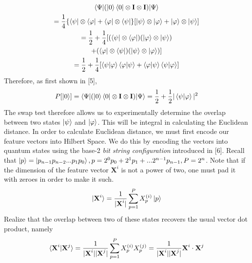 \documentclass[twocolumn, english]{revtex4-2}
\numberwithin{equation}{section}
\begin{document}
\begin{equation}\begin{gathered}
\braket{\Psi|(\ket{0}\bra{0}\otimes\textbf{I}\otimes\textbf{I})|\Psi}\\=\frac{1}{4}\{\bra{\psi}\otimes\bra{\varphi}+\bra{\varphi}\otimes\bra{\psi}\}[\ket{\psi}\otimes\ket{\varphi}+\ket{\varphi}\otimes\ket{\psi}]\\
=\frac{1}{2}+\frac{1}{4}[(\bra{\psi}\otimes\bra{\varphi})(\ket{\varphi}\otimes\ket{\psi})\\+(\bra{\varphi}\otimes\bra{\psi})(\ket{\psi}\otimes\ket{\varphi})]\\
=\frac{1}{2}+\frac{1}{4}[\braket{\psi|\varphi}\braket{\varphi|\psi}+\braket{\varphi|\psi}\braket{\psi|\varphi}]
\end{gathered}\end{equation}
Therefore, as first shown in [5],
\begin{equation}
P[\ket{0}] = \braket{\Psi|(\ket{0}\bra{0}\otimes\textbf{I}\otimes\textbf{I})|\Psi} = \frac{1}{2}+\frac{1}{2}|\braket{\psi|\varphi}|^2
\end{equation}
The swap test therefore allows us to experimentally determine the overlap between two states $\ket{\psi}$ and $\ket{\varphi}$. This will be integral in calculating the Euclidean distance. In order to calculate Euclidean distance, we must first encode our feature vectors into Hilbert Space. We do this by encoding the vectors into quantum states using the base-2 \textit{bit string configuration} introduced in [6]. Recall that $\ket{p}=\ket{p_{n-1}p_{n-2}...p_{1}p_{0}}, p=2^{0}p_{0}+2^{1}p_{1}+...2^{n-1}p_{n-1}, P=2^{n}$. Note that if the dimension of the feature vector $\textbf{X}^{i}$ is not a power of two, one must pad it with zeroes in order to make it such. 
\begin{equation}
\ket{\textbf{X}^i} = \frac{1}{|\textbf{X}^i|}\sum_{p=1}^{P} X_{p}^{(i)}\ket{p}
\end{equation}
Realize that the overlap between two of these states recovers the usual vector dot product, namely
\begin{equation}
\braket{\textbf{X}^{i}|\textbf{X}^{j}}=\frac{1}{|\textbf{X}^{i}||\textbf{X}^{j}|}\sum_{p=1}^{P}X_{p}^{(i)}X_{p}^{(j)}=\frac{1}{|\textbf{X}^{i}||\textbf{X}^{j}|}\textbf{X}^{i}\cdot\textbf{X}^{j}
\end{equation}
\end{document}
